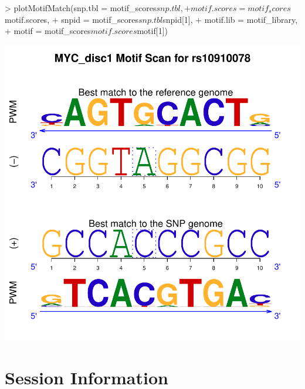 \documentclass[a4paper,10pt]{article}
\begin{document}
\begin{Schunk}
\begin{Sinput}
> plotMotifMatch(snp.tbl = motif_scores$snp.tbl,
+                motif.scores = motif_scores$motif.scores,
+                snpid = motif_scores$snp.tbl$snpid[1],
+                motif.lib = motif_library,
+                motif = motif_scores$motif.scores$motif[1])
\end{Sinput}
\end{Schunk}
\includegraphics{atsnp-015}

\section{Session Information}
\end{document}
